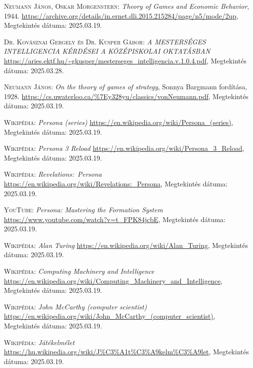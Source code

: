 \documentclass[
]{thesis-ekf}
\theoremstyle{definition}
\theoremstyle{remark}
\begin{document}
\begin{thebibliography}{2}

\textsc{Neumann János, Oskar Morgenstern}: \emph{Theory of Games and Economic Behavior}, 1944.
\url{https://archive.org/details/in.ernet.dli.2015.215284/page/n5/mode/2up}, Megtekintés dátuma: 2025.03.19.

\textsc{Dr. Kovásznai Gergely és Dr. Kusper Gábor}: \emph{A MESTERSÉGES INTELLIGENCIA KÉRDÉSEI A KÖZÉPISKOLAI OKTATÁSBAN} 
\url{https://aries.ektf.hu/~gkusper/mesterseges_intelligencia.v.1.0.4.pdf}, Megtekintés dátuma: 2025.03.28.

\textsc{Neumann János}: \emph{On the theory of games of strategy}, Sonnya Bargmann fordítása, 1928.
\url{https://cs.uwaterloo.ca/%7Ey328yu/classics/vonNeumann.pdf}, Megtekintés dátuma: 2025.03.19.

\textsc{Wikipédia:} \emph{Persona (series)} 
\url{https://en.wikipedia.org/wiki/Persona_(series)}, Megtekintés dátuma: 2025.03.19.

\textsc{Wikipédia:} \emph{Persona 3 Reload} 
\url{https://en.wikipedia.org/wiki/Persona_3_Reload}, Megtekintés dátuma: 2025.03.19.

\textsc{Wikipédia:} \emph{Revelations:~Persona} 
\url{https://en.wikipedia.org/wiki/Revelations:_Persona}, Megtekintés dátuma: 2025.03.19.

\textsc{YouTube:} \emph{Persona: Mastering the Formation System} 
\url{https://www.youtube.com/watch?v=t_FPK84jcbE}, Megtekintés dátuma: 2025.03.19.

\textsc{Wikipédia:} \emph{Alan Turing} 
\url{https://en.wikipedia.org/wiki/Alan_Turing}, Megtekintés dátuma: 2025.03.19.

\textsc{Wikipédia:} \emph{Computing Machinery and Intelligence} 
\url{https://en.wikipedia.org/wiki/Computing_Machinery_and_Intelligence}, Megtekintés dátuma: 2025.03.19.

\textsc{Wikipédia:} \emph{John McCarthy (computer scientist)} 
\url{https://en.wikipedia.org/wiki/John_McCarthy_(computer_scientist)}, Megtekintés dátuma: 2025.03.19.

\textsc{Wikipédia:} \emph{Játékelmélet} 
\url{https://hu.wikipedia.org/wiki/J%C3%A1t%C3%A9kelm%C3%A9let}, Megtekintés dátuma: 2025.03.19.


\end{thebibliography}
\end{document}
